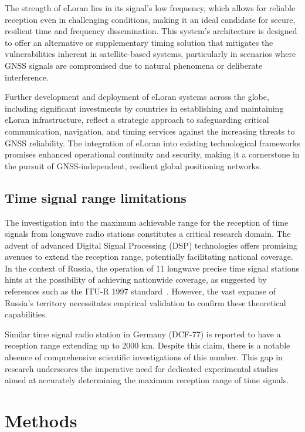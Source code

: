 \documentclass[conference]{IEEEtran}
\begin{document}
The strength of eLoran lies in its signal's low frequency, which allows for
reliable reception even in challenging conditions, making it an ideal candidate
for secure, resilient time and frequency dissemination. This system's
architecture is designed to offer an alternative or supplementary timing
solution that mitigates the vulnerabilities inherent in satellite-based
systems, particularly in scenarios where GNSS signals are compromised due to
natural phenomena or deliberate interference.

Further development and deployment of eLoran systems across the globe,
including significant investments by countries in establishing and maintaining
eLoran infrastructure, reflect a strategic approach to safeguarding critical
communication, navigation, and timing services against the increasing threats
to GNSS reliability. The integration of eLoran into existing technological
frameworks promises enhanced operational continuity and security, making it a
cornerstone in the pursuit of GNSS-independent, resilient global positioning
networks.

\subsection{Time signal range limitations}

The investigation into the maximum achievable range for the reception of time
signals from longwave radio stations constitutes a critical research domain.
The advent of advanced Digital Signal Processing (DSP) technologies offers
promising avenues to extend the reception range, potentially facilitating
national coverage. In the context of Russia, the operation of 11 longwave
precise time signal stations hints at the possibility of achieving nationwide
coverage, as suggested by references such as the ITU-R 1997
standard~\cite{itur1997standard}. However, the vast expanse of Russia's
territory necessitates empirical validation to confirm these theoretical
capabilities.

Similar time signal radio station in Germany (DCF-77) is reported to have a
reception range extending up to 2000 km. Despite this claim, there is a notable
absence of comprehensive scientific investigations of this number. This gap in
research underscores the imperative need for dedicated experimental studies
aimed at accurately determining the maximum reception range of time signals.

\section{Methods}
\end{document}
